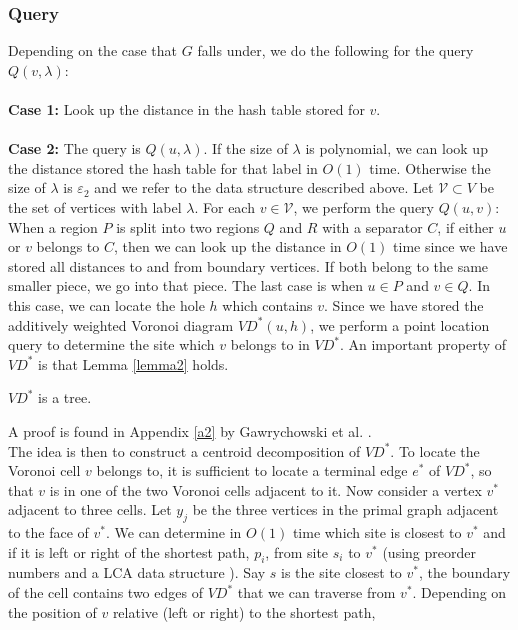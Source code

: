 \subsubsection{Query}\label{oracle2query}
Depending on the case that $G$ falls under, we do the following for the
query $Q(v, \lambda)$: \\
\\
\textbf{Case 1:} Look up the distance in the hash table stored for $v$. \\
\\
\textbf{Case 2:} The query is $Q(u,\lambda)$. If the size of $\lambda$ is polynomial,
we can look up the distance stored the hash table for that label in $O(1)$ time.
Otherwise the size of $\lambda$ is $\varepsilon_2$ and we refer to the data structure
described above. Let $\mathcal{V}\subset V$ be the set of vertices with label $\lambda$.
For each $v\in \mathcal{V}$, we perform the query $Q(u,v)$:\\
When a region $P$ is split into two regions $Q$ and $R$ with a separator $C$, if
either $u$ or $v$ belongs to $C$, then we can look up the distance in $O(1)$ time since
we have stored all distances to and from boundary vertices. If both belong to the same
smaller piece, we go into that piece. The last case is when $u\in P$ and $v\in Q$. In this
case, we can locate the hole $h$ which contains $v$. Since we have stored the
additively weighted Voronoi diagram $VD^*(u,h)$, we perform a point location query to
determine the site which $v$ belongs to in $VD^*$. An important property of $VD^*$ is that Lemma
\ref{lemma2} holds.
\begin{lemma}\label{lemma2}
  $VD^*$ is a tree.
\end{lemma}
A proof is found in Appendix \ref{a2} by Gawrychowski et al.
\cite{gawrychowski2017better}.  \\
The idea is then to construct a centroid decomposition of $VD^*$. To locate the
Voronoi cell $v$ belongs to, it is sufficient to locate a terminal edge $e^*$ of $VD^*$, so that
$v$ is in one of the two Voronoi cells adjacent to it. Now consider a vertex $v^*$
adjacent to three cells. Let $y_j$ be the three vertices in the primal graph adjacent to
the face of $v^*$. We can determine in $O(1)$ time which site is closest to $v^*$ and if it is
left or right of the shortest path, $p_i$, from site $s_i$ to $v^*$ (using preorder
numbers and a LCA data structure \cite{bender2000lca}). Say $s$ is the site closest to
$v^*$, the boundary of the cell contains two edges of
$VD^*$ that we can traverse from $v^*$. Depending on the position of $v$ relative (left or right) to the shortest path,
